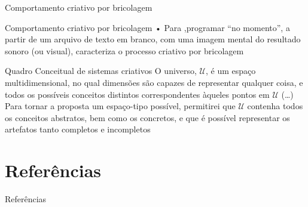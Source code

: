 \documentclass[aspectratio=169]{beamer}
\begin{document}

\begin{frame}{Comportamento criativo por bricolagem}
\haskellC
\end{frame}

\begin{frame}{Comportamento criativo por bricolagem}
• Para ,programar ``no momento'', a partir de um arquivo de texto em branco, com uma imagem mental do resultado sonoro (ou visual), caracteriza o processo criativo por bricolagem

\end{frame}

\begin{frame}{Quadro Conceitual de sistemas criativos}
O universo, $\mathcal{U}$, é um espaço multidimensional, no qual dimensões são capazes de representar qualquer coisa, e todos os possíveis conceitos distintos correspondentes àqueles pontos em $\mathcal{U}$ (\ldots) Para tornar a proposta um espaço-tipo possível, permitirei que $\mathcal{U}$ contenha todos os conceitos abstratos, bem como os concretos, e que é possível representar os artefatos tanto completos e incompletos \cite[p.~451]{wiggins_framework_2006}
\end{frame}
\section*{Referências}


\begin{frame}[allowframebreaks]{Referências}

\end{frame}

\end{document}
